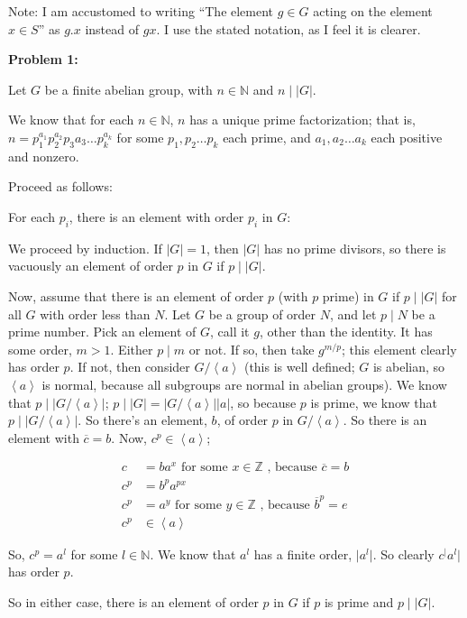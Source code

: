 \documentclass[a4paper,12pt]{article}
\newcommand{\tab}{\hspace{4mm}} %
\newcommand{\absval}[1]{\lvert #1 \rvert}
\newcommand{\anbrack}[1]{\left\langle #1 \right\rangle}
\newcommand{\N}{\mathbb{N}}
\newcommand{\Z}{\mathbb{Z}}
\begin{document}
Note: I am accustomed to writing ``The element $g \in G$ acting on the element $x \in S$'' as $g.x$ instead of $gx$. I use the stated notation, as I feel it is clearer.

{\bf Problem 1:}

Let $G$ be a finite abelian group, with $n \in \N$ and $n \mid \absval{G}$.

We know that for each $n \in \N$, $n$ has a unique prime factorization; that is, $n=p_1^{a_1}p_2^{a_2}p_3{a_3}\ldots p_k^{a_k}$ for some $p_1, p_2 \ldots p_k$ each prime, and $a_1, a_2 \ldots a_k$ each positive and nonzero.

Proceed as follows:

\tab For each $p_i$, there is an element with order $p_i$ in $G$:

\tab \tab We proceed by induction. If $\absval{G} =1$, then $\absval{G}$ has no prime divisors, so there is vacuously an element of order $p$ in $G$ if $p \mid \absval{G}$.

\tab \tab Now, assume that there is an element of order $p$ (with $p$ prime) in $G$ if $p \mid \absval{G}$ for all $G$ with order less than $N$. Let $G$ be a group of order $N$, and let $p \mid N$ be a prime number. Pick an element of $G$, call it $g$, other than the identity. It has some order, $m>1$. Either $p \mid m$ or not. If so, then take $g^{m/p}$; this element clearly has order $p$. If not, then consider $G/\anbrack{a}$ (this is well defined; $G$ is abelian, so $\anbrack{a}$ is normal, because all subgroups are normal in abelian groups). We know that $p \mid \absval{G /\anbrack{a}}$; $p \mid \absval{G} = \absval{G/\anbrack{a}}\absval{a}$, so because $p$ is prime, we know that $p \mid \absval{G/\anbrack{a}}$. So there's an element, $b$, of order $p$ in $G/\anbrack{a}$. So there is an element with $\overline{c} = b$. Now, $c^p \in \anbrack{a}$;

\begin{align*}
c &= ba^x \text{ for some $x \in \Z$ , because $\overline{c} = b$}\\
c^p &= b^pa^{px} \\
c^p &= a^y  \text{ for some $y \in \Z$ , because $\overline{b}^p = e$}\\
c^p &\in \anbrack{a}
\end{align*}

\tab \tab So, $c^p = a^l$ for some $l \in \N$. We know that $a^l$ has a finite order, $\absval{a^l}$. So clearly $c^\absval{a^l}$ has order $p$.

\tab \tab So in either case, there is an element of order $p$ in $G$ if $p$ is prime and $p \mid \absval{G}$.
\end{document}
